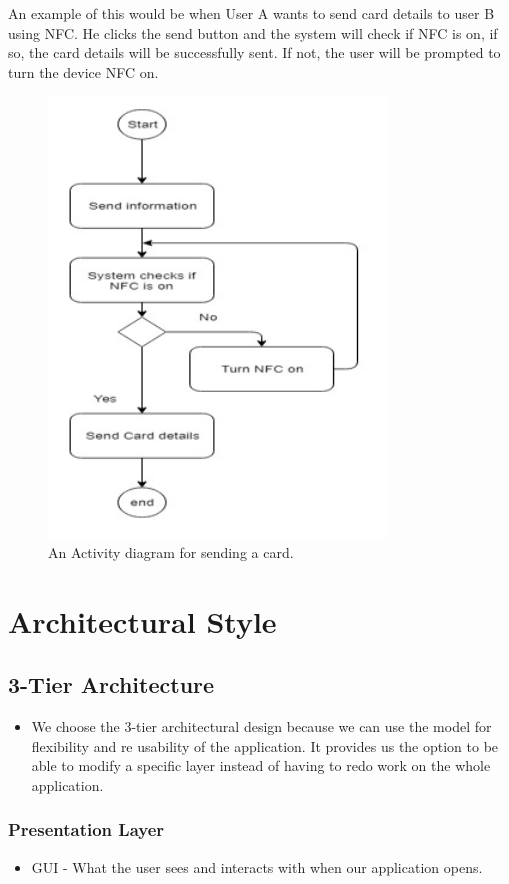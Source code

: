 \documentclass[english]{article}
\begin{document}
		An example of this would be when User A wants to send card details to user B using NFC. He clicks the send button and the system will check if NFC is on, if so, the card details will be successfully sent. If not, the user will be prompted to turn the device NFC on. 
		
		 	\begin{figure}[ht!]
		 		\centering
		 		\includegraphics[width=90mm]{SystemType.PNG}
		 		\caption{An Activity diagram for sending a card.}
		 	\end{figure}
	 	
	 
	
	
	\section{Architectural Style}
	\subsection{3-Tier Architecture}
	\begin{itemize}
		\item We choose the 3-tier architectural design because we can use the model for flexibility and re usability of the application. It provides us the option to be able to modify a specific layer instead of having to redo work on the whole application.
	\end{itemize}
	\subsubsection{Presentation Layer}
		\begin{itemize}
		\item GUI - What the user sees and interacts with when our application opens.
		\end{itemize}
	
\end{document}
